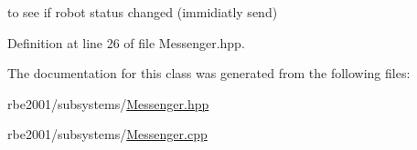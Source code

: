 to see if robot status changed (immidiatly send) 



Definition at line 26 of file Messenger.\+hpp.



The documentation for this class was generated from the following files\+:\begin{DoxyCompactItemize}
\item 
rbe2001/subsystems/\hyperlink{_messenger_8hpp}{Messenger.\+hpp}\item 
rbe2001/subsystems/\hyperlink{_messenger_8cpp}{Messenger.\+cpp}\end{DoxyCompactItemize}
